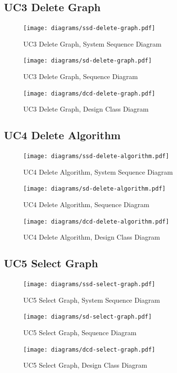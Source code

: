 \subsection{UC3 Delete Graph}
\begin{figure}[H]
    \centering
    \texttt{[image: diagrams/ssd-delete-graph.pdf]}
    \caption{UC3 Delete Graph, System Sequence Diagram}
    \label{fig:delete-graph-ssd}
\end{figure}
\begin{figure}[H]
    \centering
    \texttt{[image: diagrams/sd-delete-graph.pdf]}
    \caption{UC3 Delete Graph, Sequence Diagram}
    \label{fig:delete-graph-sd}
\end{figure}
\begin{figure}[H]
    \centering
    \texttt{[image: diagrams/dcd-delete-graph.pdf]}
    \caption{UC3 Delete Graph, Design Class Diagram}
    \label{fig:delete-graph-dcd}
\end{figure}
% 
\subsection{UC4 Delete Algorithm}
\begin{figure}[H]
    \centering
    \texttt{[image: diagrams/ssd-delete-algorithm.pdf]}
    \caption{UC4 Delete Algorithm, System Sequence Diagram}
    \label{fig:delete-algorithm-ssd}
\end{figure}
\begin{figure}[H]
    \centering
    \texttt{[image: diagrams/sd-delete-algorithm.pdf]}
    \caption{UC4 Delete Algorithm, Sequence Diagram}
    \label{fig:delete-algorithm-sd}
\end{figure}
\begin{figure}[H]
    \centering
    \texttt{[image: diagrams/dcd-delete-algorithm.pdf]}
    \caption{UC4 Delete Algorithm, Design Class Diagram}
    \label{fig:delete-algorithm-dcd}
\end{figure}
% 
\subsection{UC5 Select Graph}
\begin{figure}[H]
    \centering
    \texttt{[image: diagrams/ssd-select-graph.pdf]}
    \caption{UC5 Select Graph, System Sequence Diagram}
    \label{fig:select-graph-ssd}
\end{figure}
\begin{figure}[H]
    \centering
    \texttt{[image: diagrams/sd-select-graph.pdf]}
    \caption{UC5 Select Graph, Sequence Diagram}
    \label{fig:select-graph-sd}
\end{figure}
\begin{figure}[H]
    \centering
    \texttt{[image: diagrams/dcd-select-graph.pdf]}
    \caption{UC5 Select Graph, Design Class Diagram}
    \label{fig:select-graph-dcd}
\end{figure}
% 
